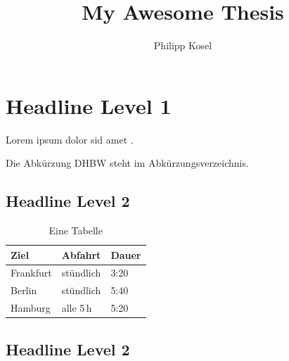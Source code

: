 \documentclass[
12pt,
BCOR=10mm,
a4paper,
abstracton,
bibliography=totoc,
listof=totoc,
smallheadings,
]{scrartcl}
\begin{document}
\title{My Awesome Thesis}
\author{Philipp Kosel}

\maketitle
\newpage

\lipsum[1]
\newpage

\lipsum[1]
\newpage

\tableofcontents
\newpage

\listoffigures
\newpage

\listoftables
\newpage

\printnomenclature
\newpage

\section{Headline Level 1}
\lipsum[1-2]

Lorem ipsum dolor sid amet \autocite{mcconnell2004}.

Die Abkürzung DHBW steht im Abkürzungsverzeichnis.

\subsection{Headline Level 2}
\lipsum[1]

\begin{table}[htbp]
    \caption{Eine Tabelle}
    \label{tab:tabelle}
    \centering
    \begin{tabular}{lll}
        \toprule
        Ziel      & Abfahrt   & Dauer \\
        \midrule
        Frankfurt & stündlich & 3:20  \\
        Berlin    & stündlich & 5:40  \\
        Hamburg   & alle 5\,h & 5:20  \\
        \bottomrule
    \end{tabular}
\end{table}

\subsection{Headline Level 2}
\lipsum[1]
\end{document}
